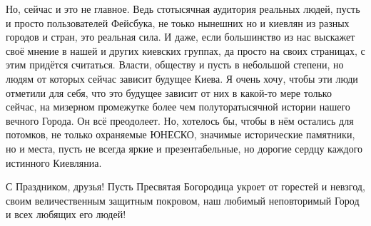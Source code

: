 Но, сейчас и это не главное. Ведь стотысячная аудитория реальных людей, пусть и
просто пользователей Фейсбука, не тоько нынешних но и киевлян из разных городов
и стран, это реальная сила. И даже, если большинство из нас выскажет своё
мнение в нашей и других киевских группах, да просто на своих страницах, с этим
придётся считаться. Власти, обществу и пусть в небольшой степени, но людям от
которых сейчас зависит будущее Киева. Я очень хочу, чтобы эти люди отметили для
себя, что это будущее зависит от них в какой-то мере только сейчас, на мизерном
промежутке более чем полуторатысячной истории нашего вечного Города. Он всё
преодолеет. Но, хотелось бы, чтобы в нём остались для потомков, не только
охраняемые ЮНЕСКО, значимые исторические памятники, но и места, пусть не всегда
яркие и презентабельные, но дорогие сердцу каждого истинного Киевляниа. 

С Праздником, друзья! Пусть Пресвятая Богородица укроет от горестей и невзгод,
своим величественным защитным покровом, наш любимый неповторимый Город и всех
любящих его людей!

